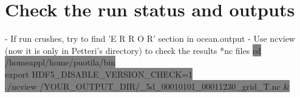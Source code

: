 \documentclass[11pt]{article}
\begin{document}
\section{Check the run status and outputs}
- If run crushes, try to find 'E R R O R' section in ocean.output 
- Use ncview (now it is only in Petteri’s directory) to check the results *nc files
\colorbox{Grey}{cd /homeappl/home/puotila/bin}\\
\colorbox{Grey}{export HDF5\_DISABLE\_VERSION\_CHECK=1}\\
\colorbox{Grey}{./ncview /YOUR\_OUTPUT\_DIR/\*\_5d\_00010101\_00011230\_grid\_T.nc \&}\\
\end{document}
